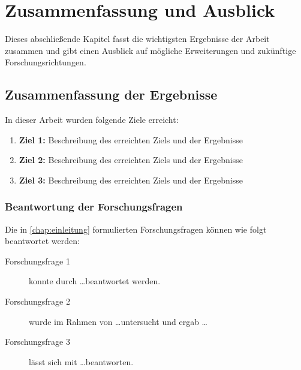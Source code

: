 
\chapter{Zusammenfassung und Ausblick}
\label{chap:schluss}


Dieses abschließende Kapitel fasst die wichtigsten Ergebnisse der Arbeit zusammen und gibt einen Ausblick auf mögliche Erweiterungen und zukünftige Forschungsrichtungen.

\section{Zusammenfassung der Ergebnisse}
\label{sec:zusammenfassung}

In dieser Arbeit wurden folgende Ziele erreicht:

\begin{enumerate}
    \item \textbf{Ziel 1:} Beschreibung des erreichten Ziels und der Ergebnisse
    \item \textbf{Ziel 2:} Beschreibung des erreichten Ziels und der Ergebnisse
    \item \textbf{Ziel 3:} Beschreibung des erreichten Ziels und der Ergebnisse
\end{enumerate}

\subsection{Beantwortung der Forschungsfragen}

Die in \autoref{chap:einleitung} formulierten Forschungsfragen können wie folgt beantwortet werden:

\begin{description}
    \item[Forschungsfrage 1] konnte durch \dots beantwortet werden.
    \item[Forschungsfrage 2] wurde im Rahmen von \dots untersucht und ergab \dots
    \item[Forschungsfrage 3] lässt sich mit \dots beantworten.
\end{description}

